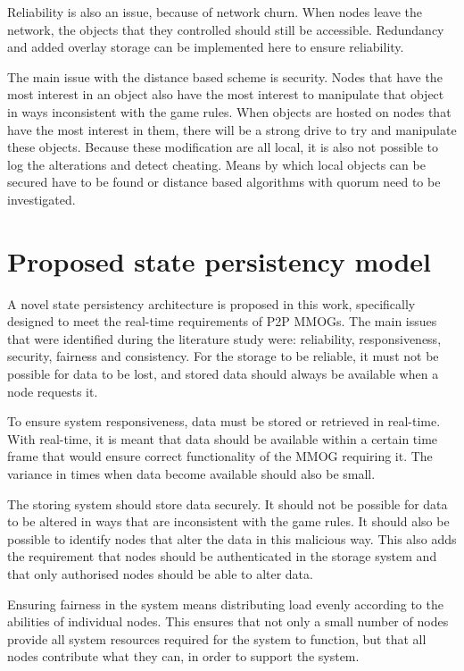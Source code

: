 \documentclass[journal,oneside,a4paper,onecolumn]{IEEEtran}
\begin{document}
Reliability is also an issue, because of network churn. When nodes leave the network, the objects that they controlled should still be accessible. Redundancy and added overlay storage can be implemented here to ensure reliability.

The main issue with the distance based scheme is security. Nodes that have the most interest in an object also have the most interest to manipulate that object in ways inconsistent with the game rules. When objects are hosted on nodes that have the most interest in them, there will be a strong drive to try and manipulate these objects. Because these modification are all local, it is also not possible to log the alterations and detect cheating. Means by which local objects can be secured have to be found or distance based algorithms with quorum need to be investigated.


\section{Proposed state persistency model}
\label{proposed_persistency}

A novel state persistency architecture is proposed in this work, specifically designed to meet the real-time requirements of P2P MMOGs. The main issues that were identified during the literature study were: reliability, responsiveness, security, fairness and consistency. For the storage to be reliable, it must not be possible for data to be lost, and stored data should always be available when a node requests it.

To ensure system responsiveness, data must be stored or retrieved in real-time. With real-time, it is meant that data should be available within a certain time frame that would ensure correct functionality of the MMOG requiring it. The variance in times when data become available should also be small.

The storing system should store data securely. It should not be possible for data to be altered in ways that are inconsistent with the game rules. It should also be possible to identify nodes that alter the data in this malicious way. This also adds the requirement that nodes should be authenticated in the storage system and that only authorised nodes should be able to alter data.

Ensuring fairness in the system means distributing load evenly according to the abilities of individual nodes. This ensures that not only a small number of nodes provide all system resources required for the system to function, but that all nodes contribute what they can, in order to support the system.
\end{document}
